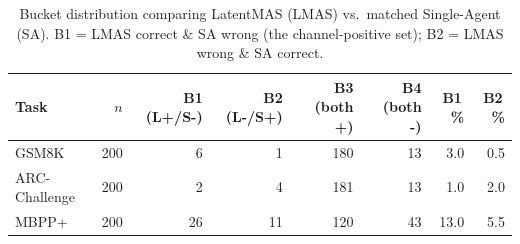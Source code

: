 \begin{table}
\caption{Bucket distribution comparing LatentMAS (LMAS) vs.\ matched Single-Agent (SA). B1 = LMAS correct \& SA wrong (the channel-positive set); B2 = LMAS wrong \& SA correct.}
\label{tab:buckets}
\centering
\begin{tabular}{lrrrrrrr}
\toprule
Task & $n$ & B1 (L+/S-) & B2 (L-/S+) & B3 (both +) & B4 (both -) & B1\,\% & B2\,\% \\
\midrule
GSM8K          & 200 &  6 &  1 & 180 & 13 &  3.0 & 0.5 \\
ARC-Challenge  & 200 &  2 &  4 & 181 & 13 &  1.0 & 2.0 \\
MBPP+          & 200 & 26 & 11 & 120 & 43 & 13.0 & 5.5 \\
\bottomrule
\end{tabular}
\end{table}
